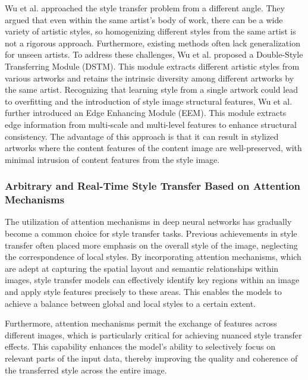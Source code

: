 Wu et al.\citep{47wu2023preserving} approached the style transfer problem from a different angle. They argued that even within the same artist's body of work, there can be a wide variety of artistic styles, so homogenizing different styles from the same artist is not a rigorous approach. Furthermore, existing methods often lack generalization for unseen artists. To address these challenges, Wu et al. proposed a Double-Style Transferring Module (DSTM). This module extracts different artistic styles from various artworks and retains the intrinsic diversity among different artworks by the same artist. Recognizing that learning style from a single artwork could lead to overfitting and the introduction of style image structural features, Wu et al. further introduced an Edge Enhancing Module (EEM). This module extracts edge information from multi-scale and multi-level features to enhance structural consistency. The advantage of this approach is that it can result in stylized artworks where the content features of the content image are well-preserved, with minimal intrusion of content features from the style image.

\subsubsection{Arbitrary and Real-Time Style Transfer Based on Attention Mechanisms}

The utilization of attention mechanisms in deep neural networks has gradually become a common choice for style transfer tasks. Previous achievements in style transfer often placed more emphasis on the overall style of the image, neglecting the correspondence of local styles. By incorporating attention mechanisms, which are adept at capturing the spatial layout and semantic relationships within images, style transfer models can effectively identify key regions within an image and apply style features precisely to these areas. This enables the models to achieve a balance between global and local styles to a certain extent.

Furthermore, attention mechanisms permit the exchange of features across different images, which is particularly critical for achieving nuanced style transfer effects. This capability enhances the model's ability to selectively focus on relevant parts of the input data, thereby improving the quality and coherence of the transferred style across the entire image.

